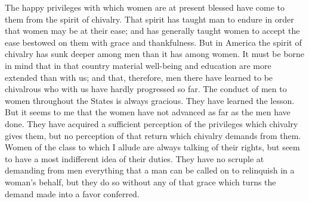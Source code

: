 The happy privileges with which women are at present blessed have
come to them from the spirit of chivalry.  That spirit has taught
man to endure in order that women may be at their ease; and has
generally taught women to accept the ease bestowed on them with
grace and thankfulness.  But in America the spirit of chivalry has
sunk deeper among men than it has among women.  It must be borne in
mind that in that country material well-being and education are
more extended than with us; and that, therefore, men there have
learned to be chivalrous who with us have hardly progressed so far.
The conduct of men to women throughout the States is always
gracious.  They have learned the lesson.  But it seems to me that
the women have not advanced as far as the men have done.  They have
acquired a sufficient perception of the privileges which chivalry
gives them, but no perception of that return which chivalry demands
from them.  Women of the class to which I allude are always talking
of their rights, but seem to have a most indifferent idea of their
duties.  They have no scruple at demanding from men everything that
a man can be called on to relinquish in a woman's behalf, but they
do so without any of that grace which turns the demand made into a
favor conferred.


